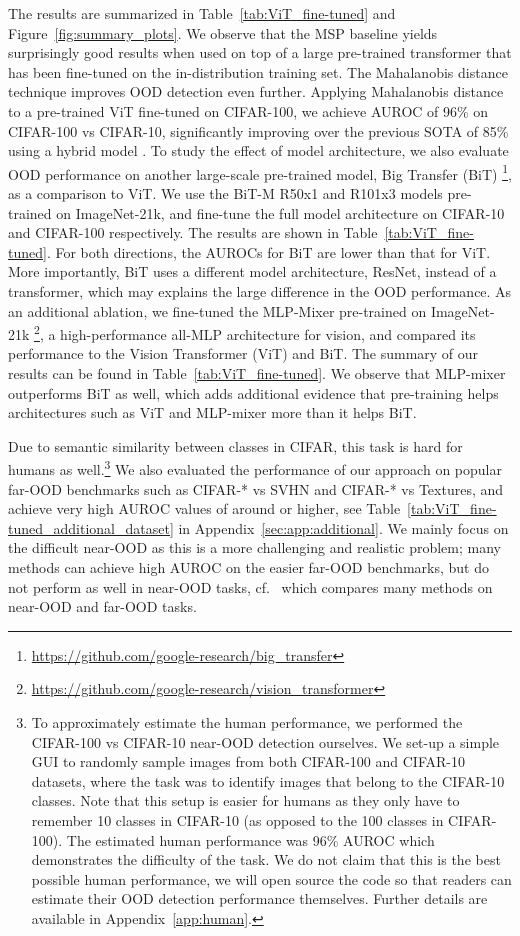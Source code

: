 \documentclass{article}
\begin{document}
The results are summarized in Table~\ref{tab:ViT_fine-tuned} and Figure~\ref{fig:summary_plots}. 
We observe that the MSP baseline yields 
surprisingly good results when used on top of a large pre-trained transformer that has been fine-tuned on the in-distribution training set. 
The Mahalanobis distance technique improves OOD detection even further. Applying Mahalanobis distance to a pre-trained ViT fine-tuned on CIFAR-100, we achieve AUROC of 96\% on CIFAR-100 vs CIFAR-10, significantly improving over the previous SOTA of 85\% using a hybrid model \citep{zhang2020hybrid}.  
To study the effect of model architecture, we also evaluate OOD  performance on another large-scale pre-trained model, Big Transfer (BiT) \citep{kolesnikov2019big}\footnote{\url{https://github.com/google-research/big\_transfer}}, as a comparison to ViT. We use the BiT-M R50x1 and R101x3 models pre-trained on ImageNet-21k, and fine-tune the full model architecture on CIFAR-10 and CIFAR-100 respectively. 
The results are shown in Table~\ref{tab:ViT_fine-tuned}. 
For both directions, the AUROCs for BiT are lower than that for ViT.
More importantly, BiT uses a different model architecture, ResNet, instead of a transformer, which may explains the large difference in the OOD performance. As an additional ablation, we fine-tuned the MLP-Mixer pre-trained on ImageNet-21k \citep{tolstikhin2021mlpmixer}\footnote{\url{https://github.com/google-research/vision_transformer}}, a high-performance all-MLP architecture for vision, and compared its performance to the Vision Transformer (ViT) and BiT. 
The summary of our results can be found in Table~\ref{tab:ViT_fine-tuned}. We observe that MLP-mixer outperforms BiT as well, which adds additional evidence that pre-training helps architectures such as ViT and MLP-mixer more than it helps BiT. 

Due to semantic similarity between classes in CIFAR, this task is hard for humans as well.\footnote{To approximately estimate the human performance, we performed the CIFAR-100 vs CIFAR-10 near-OOD detection ourselves. We set-up a simple GUI to randomly sample images from both CIFAR-100 and CIFAR-10 datasets, where the task was to identify images that belong to the CIFAR-10 classes. Note that this setup is easier for humans as they only have to remember 10 classes in CIFAR-10 (as opposed to the 100 classes in CIFAR-100). The estimated human performance was 96\% AUROC which demonstrates the difficulty of the task. We do not claim that this is the best possible human performance, we will open source the code so that readers can estimate their OOD detection performance themselves. Further details are available in Appendix~\ref{app:human}.}  
We also evaluated the performance of our approach on popular far-OOD benchmarks such as CIFAR-* vs SVHN and  CIFAR-* vs Textures, and achieve  very high AUROC values of around  or higher, see Table~\ref{tab:ViT_fine-tuned_additional_dataset} in Appendix~\ref{sec:app:additional}. We mainly focus on the difficult near-OOD as this is a more challenging and realistic problem; 
many methods can achieve high AUROC on the easier far-OOD benchmarks, but do not perform as well in near-OOD tasks, cf.~\citep[Table 1]{winkens2020contrastive} which compares many methods on near-OOD and far-OOD tasks. 
\end{document}

